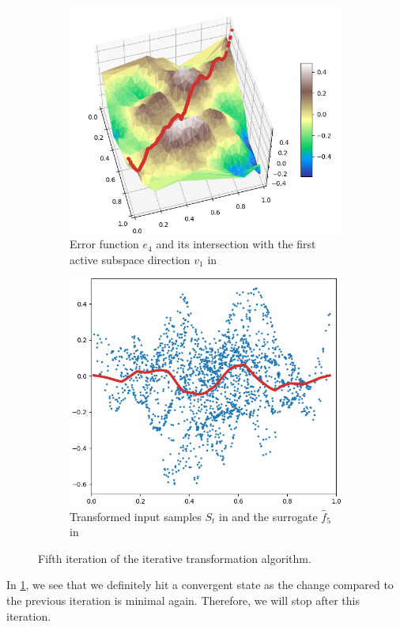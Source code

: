 \documentclass[
  a4paper,  %
  twoside,  %
  bibliography=totoc,
  headsepline,
  cleardoublepage=empty,
  parskip=half,
  draft=false
]{scrbook}
\begin{document}
\begin{mdframed}[style=style]
\begin{figure}[H]
\begin{subfigure}{.5\textwidth}
  \centering
  \includegraphics[width=.85\linewidth]{graphics/pipeline_current_5.png}
  \caption{Error function $e_4$ and its intersection with the first active subspace direction $v_1$ in \reddot}
\end{subfigure}%
\begin{subfigure}{.5\textwidth}
  \centering
  \includegraphics[width=.85\linewidth]{graphics/pipeline_local_5.png}
  \caption{Transformed input samples $S_t$ in \darkblue and the surrogate $\hat{f}_5$ in \reddot}
\end{subfigure}
\delimit
\caption{Fifth iteration of the iterative transformation algorithm.}
\label{fig:pipeline_5}
\end{figure}
\end{mdframed}
%
In \cref{fig:pipeline_5}, we see that we definitely hit a convergent state as the change compared to the previous iteration is minimal again.
Therefore, we will stop after this iteration.
\end{document}
